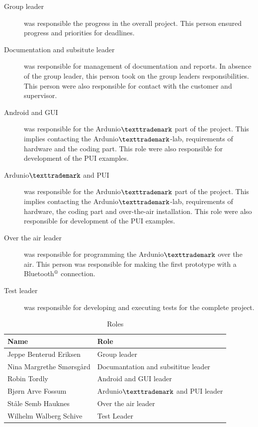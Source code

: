 \begin{description}
	\item[Group leader]{was responsible the progress in the overall project. This person ensured progress and priorities for deadlines.}
	\item[Documentation and subsitute leader]{was responsible for management of documentation and reports. In absence of the group leader, this person took on the group leaders responsibilities. This person were also responsible for contact with the customer and supervisor.}
	\item[Android and GUI]{was responsible for the Ardunio$\texttrademark$ part of the project. This implies contacting the Ardunio$\texttrademark$-lab, requirements of hardware and the coding part. This role were also responsible for development of the PUI examples.}
	\item[Ardunio$\texttrademark$ and PUI]{was responsible for the Ardunio$\texttrademark$ part of the project. This implies contacting the Ardunio$\texttrademark$-lab, requirements of hardware, the coding part and over-the-air installation. This role were also responsible for development of the PUI examples.}
	\item[Over the air leader]{was responsible for programming the Ardunio$\texttrademark$ over the air. This person was responsible for making the first prototype with a Bluetooth$\textsuperscript{\textregistered}$  connection.}
	\item[Test leader]{was responsible for developing and executing tests for the complete project.}
\end{description}

\begin{table}
\begin{tabular}{|l|l|}
\hline
	{\bf Name} & {\bf Role}\\
\hline
	Jeppe Benterud Eriksen & Group leader\\
\hline
	Nina Margrethe Smørsgård & Documantation and subsititue leader\\
\hline
	Robin Tordly & Android and GUI leader\\
\hline
	Bjørn Arve Fossum & Ardunio$\texttrademark$ and PUI leader\\
\hline
	Ståle Semb Hauknes & Over the air leader\\
\hline
	Wilhelm Walberg Schive & Test Leader\\
\hline
\end{tabular}
\caption{Roles}
\end{table}

